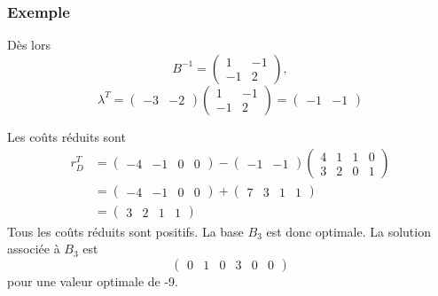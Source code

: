 \documentclass[usepdftitle=false]{beamer}
\begin{document}
\begin{frame}
\frametitle{Exemple}

Dès lors
\[
B^{-1} =
\begin{pmatrix}
1 & -1 \\
-1 & 2
\end{pmatrix},
\]
\[
\lambda^T = \begin{pmatrix} -3 & -2 \end{pmatrix}
\begin{pmatrix}
1 & -1 \\
-1 & 2
\end{pmatrix} =  
\begin{pmatrix} -1 & -1 \end{pmatrix}
\]

Les coûts réduits sont
\begin{align*}
r_D^T &=
\begin{pmatrix}
-4 & -1 & 0 & 0
\end{pmatrix}
-
\begin{pmatrix}
-1 & -1
\end{pmatrix}
\begin{pmatrix}
4 & 1 & 1 & 0 \\
3 & 2 & 0 & 1
\end{pmatrix} \\
&=
\begin{pmatrix}
-4 & -1 & 0 & 0
\end{pmatrix} +
\begin{pmatrix}
7 & 3 & 1 & 1
\end{pmatrix} \\
&=
\begin{pmatrix}
3 & 2 & 1 & 1
\end{pmatrix}
\end{align*}
Tous les coûts réduits sont positifs. La base $B_3$ est donc optimale. La solution associée à $B_3$ est
\[
\begin{pmatrix}
0 & 1 & 0 & 3 & 0 & 0
\end{pmatrix}
\]
pour une valeur optimale de -9.

\end{frame}
\end{document}
